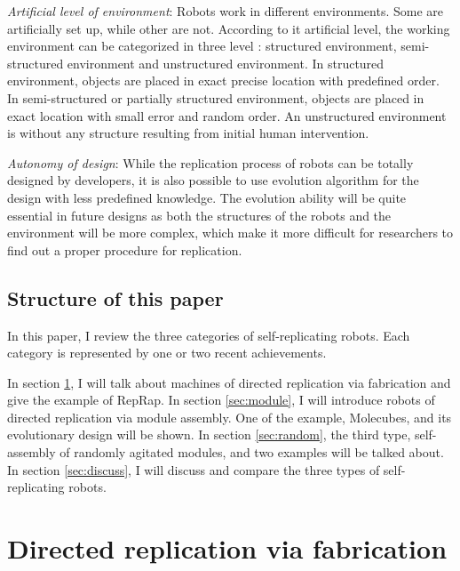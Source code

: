 \documentclass[12pt,twoside]{article}
\theoremstyle{plain}
\theoremstyle{definition}
\theoremstyle{remark}
\newcommand{\TODO}[1]{\marginpar{\emph{\small{{\bf TODO: } #1}}}}
\newcommand{\etal}{\textit{et al.}}
\begin{document}
\emph{Artificial level of environment}: Robots work in different environments. Some are artificially set up, while other are not. According to it artificial level, the working environment can be categorized in three level\cite{lee_robotic_2007} : structured environment, semi-structured environment and unstructured environment. In structured environment, objects are placed in exact precise location with predefined order. In semi-structured or partially structured environment, objects are placed in exact location with small error and random order. An unstructured environment is without any structure resulting from initial human intervention.
  
\emph{Autonomy of design}: While the replication process of robots can be totally designed by developers, it is also possible to use evolution algorithm for the design with less predefined knowledge. The evolution ability will be quite essential in future designs as both the structures of the robots and the environment will be more complex, which make it more difficult for researchers to find out a proper procedure for replication.

% 

\subsection{Structure of this paper}
In this paper, I review the three categories of self-replicating robots. Each category is represented by one or two recent achievements. 

In section \ref{sec:fabri}, I will talk about machines of directed replication via fabrication and give the example of RepRap. In section \ref{sec:module}, I will introduce robots of directed replication via module assembly. One of the example, Molecubes, and its evolutionary design will be shown. In section \ref{sec:random}, the third type, self-assembly of randomly agitated modules, and two examples will be talked about. In section \ref{sec:discuss}, I will discuss and compare the three types of self-replicating robots.

\section{Directed replication via fabrication}
\label{sec:fabri}
\end{document}
